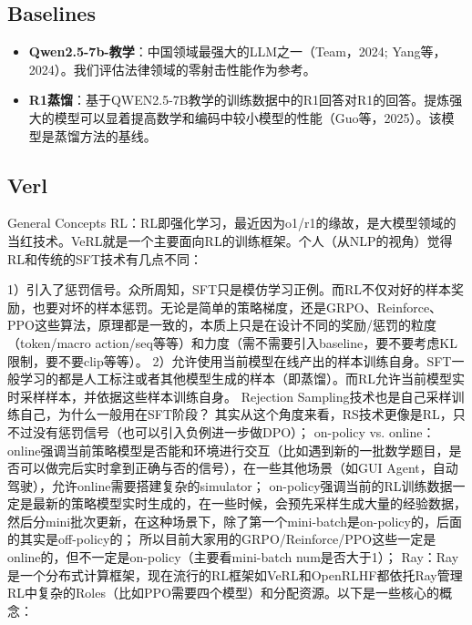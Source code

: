 \documentclass{pkuthesis}
\begin{document}
\subsection{Baselines}
\begin{itemize}
    \item \textbf{Qwen2.5-7b-教学}：中国领域最强大的LLM之一（Team，2024; Yang等，2024）。我们评估法律领域的零射击性能作为参考。
    \item \textbf{R1蒸馏}：基于QWEN2.5-7B教学的训练数据中的R1回答对R1的回答。提炼强大的模型可以显着提高数学和编码中较小模型的性能（Guo等，2025）。该模型是蒸馏方法的基线。
\end{itemize}

\subsection{Verl}
General Concepts
RL：RL即强化学习，最近因为o1/r1的缘故，是大模型领域的当红技术。VeRL就是一个主要面向RL的训练框架。个人（从NLP的视角）觉得RL和传统的SFT技术有几点不同：

1）引入了惩罚信号。众所周知，SFT只是模仿学习正例。而RL不仅对好的样本奖励，也要对坏的样本惩罚。无论是简单的策略梯度，还是GRPO、Reinforce、PPO这些算法，原理都是一致的，本质上只是在设计不同的奖励/惩罚的粒度（token/macro action/seq等等）和力度（需不需要引入baseline，要不要考虑KL限制，要不要clip等等）。
2）允许使用当前模型在线产出的样本训练自身。SFT一般学习的都是人工标注或者其他模型生成的样本（即蒸馏）。而RL允许当前模型实时采样样本，并依据这些样本训练自身。
Rejection Sampling技术也是自己采样训练自己，为什么一般用在SFT阶段？
其实从这个角度来看，RS技术更像是RL，只不过没有惩罚信号（也可以引入负例进一步做DPO）；
on-policy vs. online：
online强调当前策略模型是否能和环境进行交互（比如遇到新的一批数学题目，是否可以做完后实时拿到正确与否的信号），在一些其他场景（如GUI Agent，自动驾驶），允许online需要搭建复杂的simulator；
on-policy强调当前的RL训练数据一定是最新的策略模型实时生成的，在一些时候，会预先采样生成大量的经验数据，然后分mini批次更新，在这种场景下，除了第一个mini-batch是on-policy的，后面的其实是off-policy的；
所以目前大家用的GRPO/Reinforce/PPO这些一定是online的，但不一定是on-policy（主要看mini-batch num是否大于1）；
Ray：Ray 是一个分布式计算框架，现在流行的RL框架如VeRL和OpenRLHF都依托Ray管理RL中复杂的Roles（比如PPO需要四个模型）和分配资源。以下是一些核心的概念：
\end{document}
